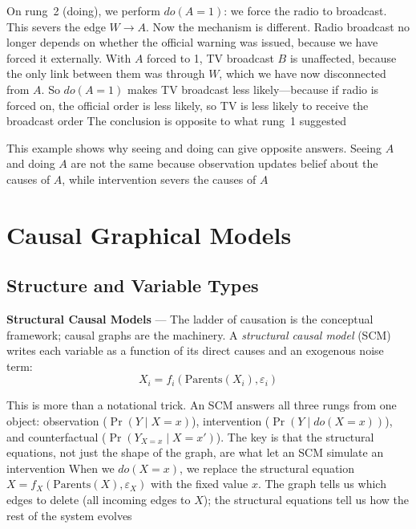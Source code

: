 On rung~2 (doing), we perform $do(A = 1)$: we force the radio to broadcast. This
severs the edge $W \to A$. Now the mechanism is different. Radio broadcast no longer
depends on whether the official warning was issued, because we have forced it
externally. With $A$ forced to 1, TV broadcast $B$ is unaffected, because the only
link between them was through $W$, which we have now disconnected from $A$. So $d
o(A=1)$ makes TV broadcast less likely—because if radio is forced on, the
official order is less likely, so TV is less likely to receive the broadcast order
The conclusion is opposite to what rung~1 suggested

This example shows why seeing and doing can give opposite answers. Seeing $A$ and
doing $A$ are not the same because observation updates belief about the causes of
$A$, while intervention severs the causes of $A$


\section{Causal Graphical Models}
\label{sec:causal-graphical-models}

\subsection{Structure and Variable Types}
\label{subsec:structure-and-variable-types}

\textbf{Structural Causal Models} --- The ladder of causation is the conceptual framework;
causal graphs are the machinery. A \emph{structural causal model} (SCM) writes
each variable as a function of its direct causes and an exogenous noise term:
\begin{equation}
  X_{i}= f_{i}(\text{Parents}(X_{i}), \varepsilon_{i}) \label{eq:scm-definition}
\end{equation}

This is more than a notational trick. An SCM answers all three rungs from one object:
observation ($\Pr(Y \mid X = x)$), intervention ($\Pr(Y \mid do(X = x))$), and
counterfactual ($\Pr(Y_{X=x}\mid X = x')$). The key is that the structural equations,
not just the shape of the graph, are what let an SCM simulate an intervention
When we $do(X = x)$, we replace the structural equation $X = f_{X}(\text{Parents}
(X), \varepsilon_{X})$ with the fixed value $x$. The graph tells us which edges
to delete (all incoming edges to $X$); the structural equations tell us how the rest
of the system evolves

